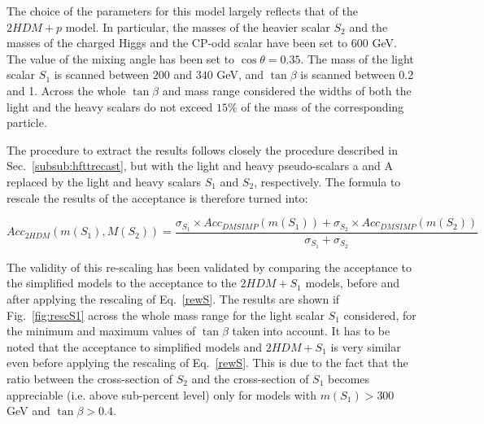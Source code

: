 The choice of the parameters for this model largely reflects that of the $2HDM+p$ model.
In particular, the masses of the heavier scalar $S_2$ and the masses of the charged Higgs and the CP-odd
scalar have been set to 600 GeV. The value of the mixing angle has been set to $\cos{\theta}=0.35$. 
The mass of the light scalar $S_1$ is scanned between $200$ and $340$ GeV, and $\tan\beta$ is scanned 
between 0.2 and 1. Across the whole $\tan\beta$ and mass range considered the widths of both the light and the heavy 
scalars do not exceed $15\%$ of the mass of the corresponding particle. 

The procedure to extract the results follows closely the procedure described in Sec.~\ref{subsub:hfttrecast}, 
but with the light and heavy pseudo-scalars a and A replaced by the light and heavy scalars
 $S_1$ and $S_2$, respectively.
The formula to rescale the results of the acceptance is therefore turned into:

\begin{equation}
Acc_{2HDM}(m(S_1),M(S_2))=\frac{\sigma_{S_1} \times Acc_{DMSIMP}(m(S_{1}))+
\sigma_{S_2} \times Acc_{DMSIMP}(m(S_{2}))}{\sigma_{S_1}+\sigma_{S_2}}
\label{rewS}
\end{equation}


The validity of this re-scaling has been validated by comparing the acceptance 
to the simplified models to the acceptance to the $2HDM+S_1$ models, before and 
after applying the rescaling of Eq.~\ref{rewS}. The results are shown if Fig.~\ref{fig:rescS1} across the whole
mass range for the light scalar $S_1$ considered, for the minimum and maximum values of 
$\tan\beta$ taken into account. 
It has to be noted that the acceptance to simplified models and $2HDM+S_1$ is very similar even 
before applying the rescaling of Eq.~\ref{rewS}.
This is due to the fact that the ratio between the cross-section of $S_2$ and the cross-section of $S_1$
becomes appreciable (i.e. above sub-percent level) only for models with $m(S_1)>300$ GeV
 and $\tan\beta > 0.4$.\\

